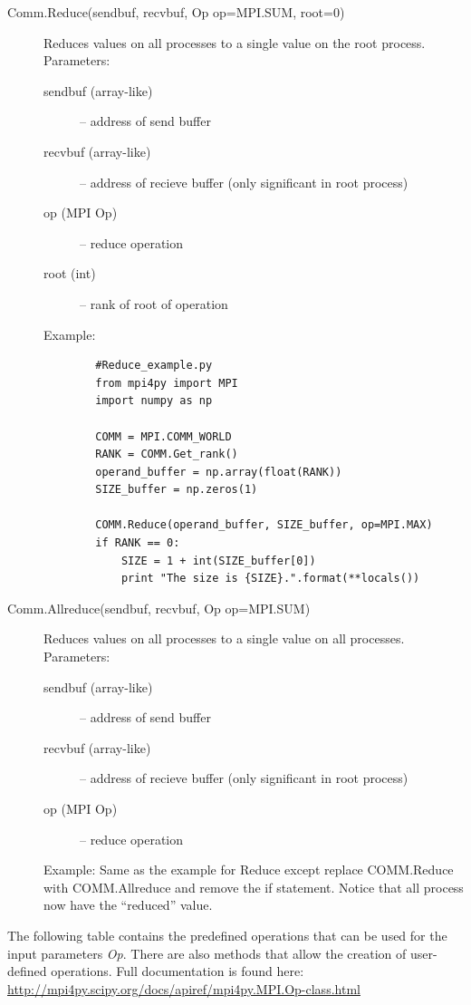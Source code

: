 \begin{description}
  \item[Comm.Reduce(sendbuf, recvbuf, Op op=MPI.SUM, root=0)]
    Reduces values on all processes to a single value on the root process.
    Parameters:
    \begin{description}
      \item[sendbuf (array-like)] – address of send buffer
      \item[recvbuf (array-like)] – address of recieve buffer (only significant in root process)
      \item[op (MPI Op)] – reduce operation
      \item[root (int)] – rank of root of operation
    \end{description}
    Example:
      \begin{lstlisting}
        #Reduce_example.py
        from mpi4py import MPI
        import numpy as np

        COMM = MPI.COMM_WORLD
        RANK = COMM.Get_rank()
        operand_buffer = np.array(float(RANK))
        SIZE_buffer = np.zeros(1)

        COMM.Reduce(operand_buffer, SIZE_buffer, op=MPI.MAX)
        if RANK == 0:
            SIZE = 1 + int(SIZE_buffer[0])
            print "The size is {SIZE}.".format(**locals())
      \end{lstlisting} 
  \item[Comm.Allreduce(sendbuf, recvbuf, Op op=MPI.SUM)]
    Reduces values on all processes to a single value on all processes.
    Parameters:
    \begin{description}
      \item[sendbuf (array-like)] – address of send buffer
      \item[recvbuf (array-like)] – address of recieve buffer (only significant in root process)
      \item[op (MPI Op)] – reduce operation
    \end{description}
    Example:
      Same as the example for Reduce except replace COMM.Reduce with COMM.Allreduce and remove the if statement. Notice that all process now have the “reduced” value.
\end{description}

  The following table contains the predefined operations that can be used for the input parameters \emph{Op}. There are also methods that allow the creation of user-defined operations. Full documentation is found here: \href{http://mpi4py.scipy.org/docs/apiref/mpi4py.MPI.Op-class.html}{http://mpi4py.scipy.org/docs/apiref/mpi4py.MPI.Op-class.html}

